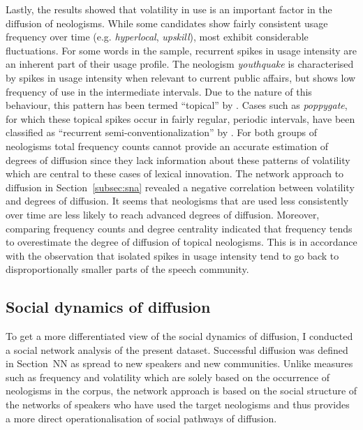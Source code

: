 \documentclass[
  a4paper,
  abstract=on,
  captions=tableabove,
  ]{scrartcl}
\newcommand{\ol}[1]{\emph{#1}}
\begin{document}
    Lastly, the results showed that volatility in use is an important factor in the diffusion of neologisms. While some candidates show fairly consistent usage frequency over time (e.g. \ol{hyperlocal}, \ol{upskill}), most exhibit considerable fluctuations. For some words in the sample, recurrent spikes in usage intensity are an inherent part of their usage profile. The neologism \ol{youthquake} is characterised by spikes in usage intensity when relevant to current public affairs, but shows low frequency of use in the intermediate intervals. Due to the nature of this behaviour, this pattern has been termed \enquote{topical} by \textcite{Fischer1998LexicalChange}. Cases such as \ol{poppygate}, for which these topical spikes occur in fairly regular, periodic intervals, have been classified as \enquote{recurrent semi-conventionalization} by \textcite{Kerremans2015WebNew}. For both groups of neologisms total frequency counts cannot provide an accurate estimation of degrees of diffusion since they lack information about these patterns of volatility which are central to these cases of lexical innovation. The network approach to diffusion in Section~\ref{subsec:sna} revealed a negative correlation between volatility and degrees of diffusion. It seems that neologisms that are used less consistently over time are less likely to reach advanced degrees of diffusion. Moreover, comparing frequency counts and degree centrality indicated that frequency tends to overestimate the degree of diffusion of topical neologisms. This is in accordance with the observation that isolated spikes in usage intensity tend to go back to disproportionally smaller parts of the speech community.



  \subsection{Social dynamics of diffusion}

    To get a more differentiated view of the social dynamics of diffusion, I conducted a social network analysis of the present dataset. Successful diffusion was defined in Section~NN as spread to new speakers and new communities. Unlike measures such as frequency and volatility which are solely based on the occurrence of neologisms in the corpus, the network approach is based on the social structure of the networks of speakers who have used the target neologisms and thus provides a more direct operationalisation of social pathways of diffusion.
\end{document}
